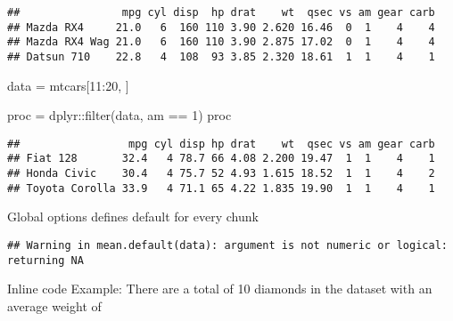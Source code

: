 \documentclass[
]{article}
\newenvironment{Shaded}{\begin{snugshade}}{\end{snugshade}}
\newcommand{\AttributeTok}[1]{\textcolor[rgb]{0.77,0.63,0.00}{#1}}
\newcommand{\ConstantTok}[1]{\textcolor[rgb]{0.00,0.00,0.00}{#1}}
\newcommand{\DecValTok}[1]{\textcolor[rgb]{0.00,0.00,0.81}{#1}}
\newcommand{\FunctionTok}[1]{\textcolor[rgb]{0.00,0.00,0.00}{#1}}
\newcommand{\NormalTok}[1]{#1}
\newcommand{\OtherTok}[1]{\textcolor[rgb]{0.56,0.35,0.01}{#1}}
\newcommand{\SpecialCharTok}[1]{\textcolor[rgb]{0.00,0.00,0.00}{#1}}
\begin{document}
\begin{verbatim}
##                mpg cyl disp  hp drat    wt  qsec vs am gear carb
## Mazda RX4     21.0   6  160 110 3.90 2.620 16.46  0  1    4    4
## Mazda RX4 Wag 21.0   6  160 110 3.90 2.875 17.02  0  1    4    4
## Datsun 710    22.8   4  108  93 3.85 2.320 18.61  1  1    4    1
\end{verbatim}

\begin{Shaded}
\begin{Highlighting}[]
\NormalTok{data }\OtherTok{=}\NormalTok{ mtcars[}\DecValTok{11}\SpecialCharTok{:}\DecValTok{20}\NormalTok{, ]}
\end{Highlighting}
\end{Shaded}

\begin{Shaded}
\begin{Highlighting}[]
\NormalTok{proc }\OtherTok{=}\NormalTok{ dplyr}\SpecialCharTok{::}\FunctionTok{filter}\NormalTok{(data, am }\SpecialCharTok{==} \DecValTok{1}\NormalTok{)}
\NormalTok{proc}
\end{Highlighting}
\end{Shaded}

\begin{verbatim}
##                 mpg cyl disp hp drat    wt  qsec vs am gear carb
## Fiat 128       32.4   4 78.7 66 4.08 2.200 19.47  1  1    4    1
## Honda Civic    30.4   4 75.7 52 4.93 1.615 18.52  1  1    4    2
## Toyota Corolla 33.9   4 71.1 65 4.22 1.835 19.90  1  1    4    1
\end{verbatim}

Global options defines default for every chunk

\begin{Shaded}
\end{Shaded}

\begin{verbatim}
## Warning in mean.default(data): argument is not numeric or logical: returning NA
\end{verbatim}

Inline code Example: There are a total of 10 diamonds in the dataset
with an average weight of
\end{document}
